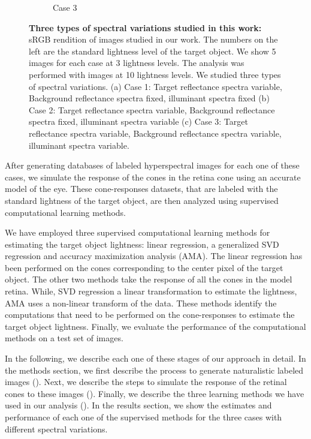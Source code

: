 \documentclass{jov}
\begin{document}
\begin{figure}
\begin{subfigure}[b]{0.33 \textwidth}
        \caption{Case 3}
        \label{fig:allSpectraVarying}
    \end{subfigure}    
    \caption{{\bf Three types of spectral variations studied in this work:} sRGB rendition of images studied in our work. The numbers on the left are the standard lightness level of the target object. We show 5 images for each case at 3 lightness levels. The analysis was performed with images at 10 lightness levels. We studied three types of spectral variations. (a) Case 1: Target reflectance spectra variable, Background reflectance spectra fixed, illuminant spectra fixed (b) Case 2: Target reflectance spectra variable, Background reflectance spectra fixed, illuminant spectra variable (c) Case 3: Target reflectance spectra variable, Background reflectance spectra variable, illuminant spectra variable.}
\label{fig:studiedCases}
\end{figure}

After generating databases of labeled hyperspectral images for each one of these cases, we simulate the response of the cones in the retina cone using an accurate model of the eye. These cone-responses datasets, that are labeled with the standard lightness of the target object, are then analyzed using supervised computational learning methods. 

We have employed three supervised computational learning methods for estimating the target object lightness: linear regression, a generalized SVD regression and accuracy maximization analysis (AMA). The linear regression has been performed on the cones corresponding to the center pixel of the target object. The other two methods take the response of all the cones in the model retina. While, SVD regression a linear transformation to estimate the lightness, AMA uses a non-linear transform of the data. These methods identify the computations that need to be performed on the cone-responses to estimate the target object lightness. Finally, we evaluate the performance of the computational methods on a test set of images.

In the following, we describe each one of these stages of our approach in detail. In the methods section, we first describe the process to generate naturalistic labeled images (). Next, we describe the steps to simulate the response of the retinal cones to these images (). Finally, we describe the three learning methods we have used in our analysis (). In the results section, we show the estimates and performance of each one of the supervised methods for the three cases with different spectral variations. 
\end{document}
